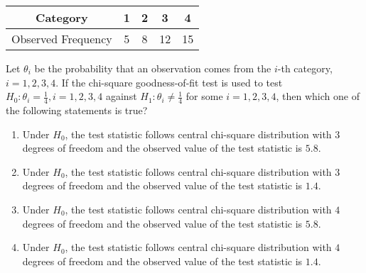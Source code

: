 \documentclass[journal]{IEEEtran}
\numberwithin{equation}{enumi}
\numberwithin{figure}{enumi}
\begin{document}
\begin{enumerate}
\begin{tabular}{|c|c|c|c|c|}
\hline
Category & 1 & 2 & 3 & 4 \\
\hline
Observed Frequency & 5 & 8 & 12 & 15 \\
\hline
\end{tabular}

Let $\theta_i$ be the probability that an observation comes from the $i$-th category, $i = 1, 2, 3, 4$. If the chi-square goodness-of-fit test is used to test $H_0: \theta_i = \frac{1}{4}, i = 1, 2, 3, 4$ against $H_1: \theta_i \neq \frac{1}{4}$ for some $i = 1, 2, 3, 4$, then which one of the following statements is true?

\begin{enumerate}
    \item Under $H_0$, the test statistic follows central chi-square distribution with $3$ degrees of freedom and the observed value of the test statistic is $5.8$.
    \item Under $H_0$, the test statistic follows central chi-square distribution with $3$ degrees of freedom and the observed value of the test statistic is $1.4$.
    \item Under $H_0$, the test statistic follows central chi-square distribution with $4$ degrees of freedom and the observed value of the test statistic is $5.8$.
    \item Under $H_0$, the test statistic follows central chi-square distribution with $4$ degrees of freedom and the observed value of the test statistic is $1.4$.
\end{enumerate}
\end{enumerate}
\end{document}

